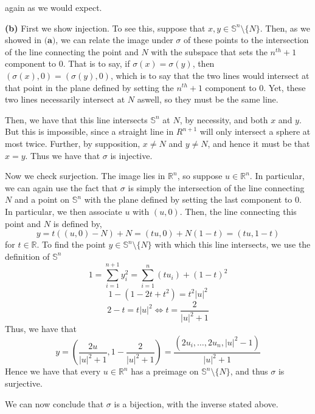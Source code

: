 \documentclass[10pt]{article}
\newcommand{\R}{\mathbb{R}}
\newcommand{\Sp}{\mathbb{S}}
\begin{document}
again as we would expect.

\textbf{(b)} First we show injection. To see this, suppose that $x,y \in \Sp^{n}\setminus \{N\}$. Then, as we showed in $\textbf{(a)}$, we can relate the image under $\sigma$ of these points to the intersection of the line connecting the point and $N$ with the subspace that sets the $n^{th}+1$ component to 0. That is to say, if $\sigma(x) = \sigma(y)$, then $(\sigma(x),0) = (\sigma(y),0)$, which is to say that the two lines would intersect at that point in the plane defined by setting the $n^{th}+1$ component to 0. Yet, these two lines necessarily intersect at $N$ aswell, so they must be the same line.

Then, we have that this line intersects $\Sp^{n}$ at $N$, by necessity, and both $x$ and $y$. But this is impossible, since a straight line in $R^{n+1}$ will only intersect a sphere at most twice. Further, by supposition, $x \neq N$ and $y \neq N$, and hence it must be that $x=y$. Thus we have that $\sigma$ is injective.

Now we check surjection. The image lies in $\R^{n}$, so suppose $u\in\R^{n}$. In particular, we can again use the fact that $\sigma$ is simply the intersection of the line connecting $N$ and a point on $\Sp^{n}$ with the plane defined by setting the last component to 0. In particular, we then associate $u$ with $(u,0)$. Then, the line connecting this point and $N$ is defined by,
$$y = t((u,0) - N) + N = (tu,0) + N(1-t) = (tu,1-t)$$
for $t\in\R$. To find the point $y\in \Sp^{n}\setminus \{N\}$ with which this line intersects, we use the definition of $\Sp^{n}$
$$1 = \sum_{i=1}^{n+1}y_{i}^{2} = \sum_{i=1}^{n}(tu_{i}) + (1-t)^{2}$$
$$1 - (1 -2t +t^{2}) = t^{2}|u|^{2}$$
$$2 - t = t|u|^{2} \iff t = \frac{2}{|u|^{2} +1}$$
Thus, we have that
$$y = \left(\frac{2u}{|u|^{2} + 1},1 - \frac{2}{|u|^{2} + 1}\right) = \frac{(2u_{i},\dots,2u_{n},|u|^{2}-1)}{|u|^{2} + 1}$$
Hence we have that every $u\in\R^{n}$ has a preimage on $\Sp^{n}\setminus \{N\}$, and thus $\sigma$ is surjective.

We can now conclude that $\sigma$ is a bijection, with the inverse stated above.
\end{document}

